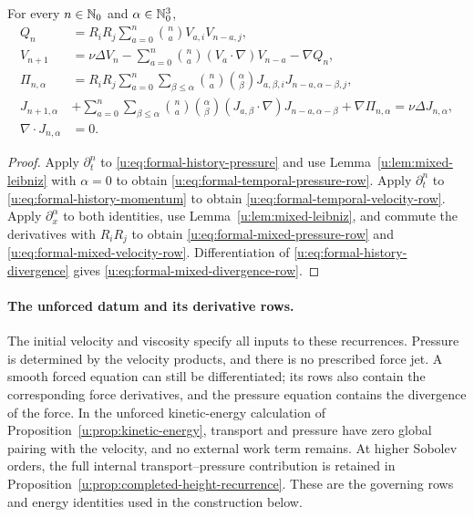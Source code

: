 \begin{proposition}
\label{u:prop:formal-mixed-recurrences}
For every \(n\in\mathbb N_0\) and \(\alpha\in\mathbb N_0^3\),
\begin{align}
 Q_n
 &=R_iR_j
 \sum_{a=0}^{n}\binom na V_{a,i}V_{n-a,j},
 \label{u:eq:formal-temporal-pressure-row}\\
 V_{n+1}
 &=
 \nu\Delta V_n
 -\sum_{a=0}^{n}\binom na(V_a\cdot\nabla)V_{n-a}
 -\nabla Q_n,
 \label{u:eq:formal-temporal-velocity-row}\\
 \Pi_{n,\alpha}
 &=R_iR_j
 \sum_{a=0}^{n}\sum_{\beta\le\alpha}
 \binom na\binom{\alpha}{\beta}
 J_{a,\beta,i}J_{n-a,\alpha-\beta,j},
 \label{u:eq:formal-mixed-pressure-row}\\
 J_{n+1,\alpha}
 &+
 \sum_{a=0}^{n}\sum_{\beta\le\alpha}
 \binom na\binom{\alpha}{\beta}
 (J_{a,\beta}\cdot\nabla)
 J_{n-a,\alpha-\beta}
 +\nabla\Pi_{n,\alpha}
 =\nu\Delta J_{n,\alpha},
 \label{u:eq:formal-mixed-velocity-row}\\
 \nabla\cdot J_{n,\alpha}&=0.
 \label{u:eq:formal-mixed-divergence-row}
\end{align}
\end{proposition}

\begin{proof}
Apply \(\partial_t^n\) to \eqref{u:eq:formal-history-pressure} and use
Lemma~\ref{u:lem:mixed-leibniz} with \(\alpha=0\) to obtain
\eqref{u:eq:formal-temporal-pressure-row}.  Apply \(\partial_t^n\) to
\eqref{u:eq:formal-history-momentum} to obtain
\eqref{u:eq:formal-temporal-velocity-row}.  Apply
\(\partial_x^\alpha\) to both identities, use
Lemma~\ref{u:lem:mixed-leibniz}, and commute the derivatives with \(R_iR_j\)
to obtain \eqref{u:eq:formal-mixed-pressure-row} and
\eqref{u:eq:formal-mixed-velocity-row}.  Differentiation of
\eqref{u:eq:formal-history-divergence} gives
\eqref{u:eq:formal-mixed-divergence-row}.
\end{proof}

\paragraph{The unforced datum and its derivative rows.}
The initial velocity and viscosity specify all inputs to these recurrences.
Pressure is determined by the velocity products, and there is no prescribed
force jet. A smooth forced equation can still be differentiated; its rows
also contain the corresponding force derivatives, and the pressure equation
contains the divergence of the force. In the unforced kinetic-energy
calculation of Proposition~\ref{u:prop:kinetic-energy}, transport and pressure
have zero global pairing with the velocity, and no external work term
remains. At higher Sobolev orders, the full internal transport--pressure
contribution is retained in
Proposition~\ref{u:prop:completed-height-recurrence}. These are the governing
rows and energy identities used in the construction below.


